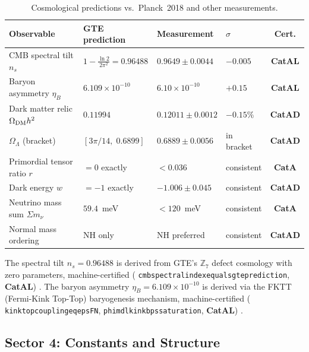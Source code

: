 \documentclass[11pt,a4paper]{article}
\newcommand{\lean}[1]{%
  \penalty-100
  \begingroup\def\_{\textunderscore\allowbreak}\texttt{#1}\endgroup}
\newcommand{\CatAL}{\textbf{CatAL}}
\newcommand{\CatAD}{\textbf{CatAD}}
\newcommand{\CatA}{\textbf{CatA}}
\begin{document}
\begin{table}[htbp]
\centering
\caption{Cosmological predictions vs.\ Planck~2018 and other measurements.}
\label{tab:cosmo}
\setlength{\tabcolsep}{4pt}
\begin{tabular}{llllc}
\toprule
Observable & GTE prediction & Measurement & $\sigma$ & Cert. \\
\midrule
CMB spectral tilt $n_s$ & $1 - \frac{\ln 2}{2\pi^2} = 0.96488$ & $0.9649 \pm 0.0044$ & $-0.005$ & \CatAL \\
Baryon asymmetry $\eta_B$ & $6.109 \times 10^{-10}$ & $6.10 \times 10^{-10}$ & $+0.15$ & \CatAL \\
Dark matter relic $\Omega_{\rm DM} h^2$ & $0.11994$ & $0.12011 \pm 0.0012$ & $-0.15\%$ & \CatAD \\
$\Omega_\Lambda$ (bracket) & $[3\pi/14,\; 0.6899]$ & $0.6889 \pm 0.0056$ & in bracket & \CatAD \\
Primordial tensor ratio $r$ & $= 0$ exactly & $< 0.036$ & consistent & \CatA \\
Dark energy $w$ & $= -1$ exactly & $-1.006 \pm 0.045$ & consistent & \CatAD \\
Neutrino mass sum $\Sigma m_\nu$ & $59.4$~meV & $< 120$~meV & consistent & \CatA \\
Normal mass ordering & NH only & NH preferred & consistent & \CatAD \\
\bottomrule
\end{tabular}
\end{table}

The spectral tilt $n_s = 0.96488$ is derived from GTE's $\mathbb{Z}_7$ defect
cosmology with zero parameters, machine-certified
(\lean{cmb\_spectral\_index\_equals\_gte\_prediction}, \CatAL)
\cite{SpivackGTECosmology}.  The baryon asymmetry $\eta_B = 6.109 \times 10^{-10}$
is derived via the FKTT (Fermi-Kink Top-Top) baryogenesis mechanism, machine-certified
(\lean{kink\_top\_coupling\_eq\_eps\_FN}, \lean{phi\_mdl\_kink\_bps\_saturation},
\CatAL) \cite{SpivackGTECosmology}.

\subsection{Sector 4: Constants and Structure}
\end{document}
